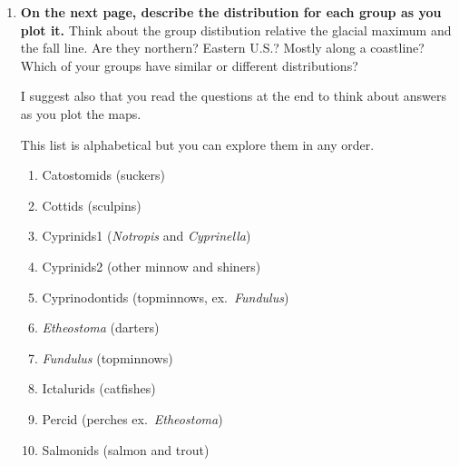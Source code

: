 \documentclass[11pt]{article}
\begin{document}
\begin{enumerate}[resume]
\item \textbf{On the next page, describe the distribution for each group as you plot it.} Think about the group distibution relative the glacial maximum and the fall line. Are they northern? Eastern U.S.?
Mostly along a coastline? Which of your groups have similar or  different distributions? 

I suggest also that you read the questions at the end to think about answers as you plot the maps. \vspace{\baselineskip}


\newpage

This list is alphabetical but you can explore them in any order.

	\begin{enumerate}[label=\alph*., leftmargin=*]

		\item Catostomids (suckers)\vspace{3\baselineskip}

		\item Cottids (sculpins)\vspace{3\baselineskip}

		\item Cyprinids1 (\textit{Notropis} and \textit{Cyprinella})\vspace{3\baselineskip}

		\item Cyprinids2 (other minnow and shiners)\vspace{3\baselineskip}

		\item Cyprinodontids (topminnows, ex.~\textit{Fundulus})\vspace{3\baselineskip}

		\item \textit{Etheostoma} (darters)\vspace{3\baselineskip}

		\item \textit{Fundulus} (topminnows)\vspace{3\baselineskip}

		\item Ictalurids (catfishes)\vspace{3\baselineskip}

		\item Percid (perches ex.~\textit{Etheostoma})\vspace{3\baselineskip}

		\item Salmonids (salmon and trout)\vspace{3\baselineskip}
	\end{enumerate}
\end{enumerate}
\end{document}
